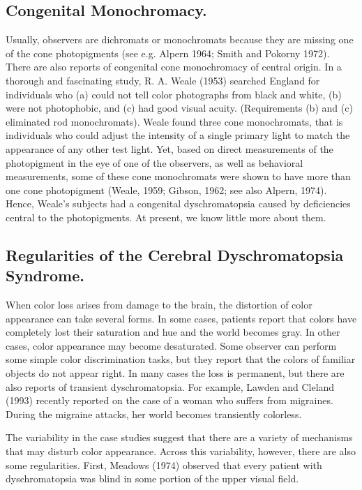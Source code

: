 \subsection*{Congenital Monochromacy. }
Usually, observers are dichromats or monochromats because they are
missing one of the cone photopigments (see e.g.  Alpern 1964; Smith
and Pokorny 1972).  There are also reports of congenital
cone monochromacy of central origin.  In a thorough and fascinating
study, R. A. Weale (1953) searched England for individuals who (a)
could not tell color photographs from black and white, (b) were not
photophobic, and (c) had good visual acuity.  (Requirements (b) and
(c) eliminated rod monochromats).  Weale found three cone
monochromats, that is individuals who could adjust the intensity of a
single primary light to match the appearance of any other test light.
Yet, based on direct measurements of the photopigment in the eye of
one of the observers, as well as behavioral measurements, some of
these cone monochromats were shown to have more than one cone
photopigment (Weale, 1959; Gibson, 1962; see also Alpern, 1974).
Hence, Weale's subjects had a congenital dyschromatopsia caused by
deficiencies central to the photopigments.  At present, we know little
more about them.

\subsection*{Regularities of the Cerebral Dyschromatopsia Syndrome.  }
When color loss arises from damage to the brain, the distortion of
color appearance can take several forms.  In some cases, patients
report that colors have completely lost their saturation and hue and
the world becomes gray.  In other cases, color appearance may become
desaturated.  Some observer can perform some simple color
discrimination tasks, but they report that the colors of familiar
objects do not appear right.  In many cases the loss is permanent, but
there are also reports of transient dyschromatopsia.  For example,
Lawden and Cleland (1993) recently reported on the case of a woman who
suffers from migraines.  During the migraine attacks, her world
becomes transiently colorless.

The variability in the case studies suggest that there are a variety
of mechanisms that may disturb color appearance.  Across this
variability, however, there are also some regularities.  First,
Meadows (1974) observed that every patient with dyschromatopsia was
blind in some portion of the upper visual field.

